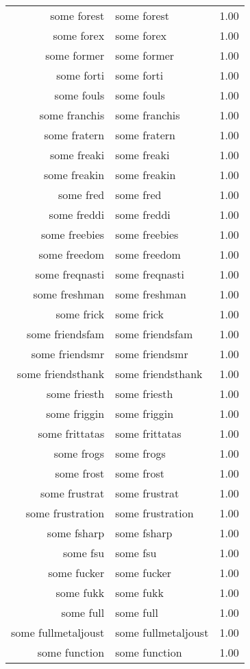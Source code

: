 \begin{table}[ht]
\begin{tabular}{rlr}
  some forest & some forest & 1.00 \\ 
  some forex & some forex & 1.00 \\ 
  some former & some former & 1.00 \\ 
  some forti & some forti & 1.00 \\ 
  some fouls & some fouls & 1.00 \\ 
  some franchis & some franchis & 1.00 \\ 
  some fratern & some fratern & 1.00 \\ 
  some freaki & some freaki & 1.00 \\ 
  some freakin & some freakin & 1.00 \\ 
  some fred & some fred & 1.00 \\ 
  some freddi & some freddi & 1.00 \\ 
  some freebies & some freebies & 1.00 \\ 
  some freedom & some freedom & 1.00 \\ 
  some freqnasti & some freqnasti & 1.00 \\ 
  some freshman & some freshman & 1.00 \\ 
  some frick & some frick & 1.00 \\ 
  some friendsfam & some friendsfam & 1.00 \\ 
  some friendsmr & some friendsmr & 1.00 \\ 
  some friendsthank & some friendsthank & 1.00 \\ 
  some friesth & some friesth & 1.00 \\ 
  some friggin & some friggin & 1.00 \\ 
  some frittatas & some frittatas & 1.00 \\ 
  some frogs & some frogs & 1.00 \\ 
  some frost & some frost & 1.00 \\ 
  some frustrat & some frustrat & 1.00 \\ 
  some frustration & some frustration & 1.00 \\ 
  some fsharp & some fsharp & 1.00 \\ 
  some fsu & some fsu & 1.00 \\ 
  some fucker & some fucker & 1.00 \\ 
  some fukk & some fukk & 1.00 \\ 
  some full & some full & 1.00 \\ 
  some fullmetaljoust & some fullmetaljoust & 1.00 \\ 
  some function & some function & 1.00 \\ 

\end{tabular}
\end{table}

